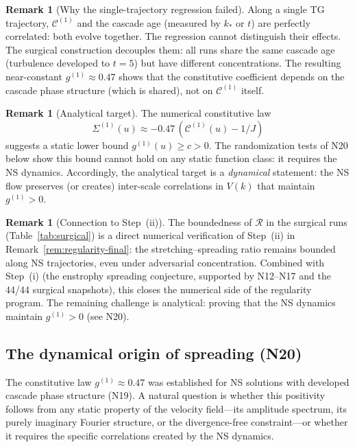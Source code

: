 \documentclass[11pt]{article}
\theoremstyle{definition}
\newtheorem{remark}[theorem]{Remark}
\newcommand{\cC}{\mathcal{C}}
\begin{document}
\begin{remark}[Why the single-trajectory regression
failed]
Along a single TG trajectory, $\cC^{(1)}$ and the
cascade age (measured by $k_*$ or $t$) are perfectly
correlated: both evolve together.  The regression
cannot distinguish their effects.  The surgical
construction decouples them: all runs share the same
cascade age (turbulence developed to $t=5$) but have
different concentrations.  The resulting near-constant
$g^{(1)}\approx 0.47$ shows that the constitutive
coefficient depends on the cascade phase structure
(which is shared), not on $\cC^{(1)}$ itself.
\end{remark}

\begin{remark}[Analytical target]
\label{rem:analytical-target}
The numerical constitutive law
\begin{equation}\label{eq:constitutive-target}
\Sigma^{(1)}(u) \approx -0.47\,
(\cC^{(1)}(u)-1/J)
\end{equation}
suggests a static lower bound
$g^{(1)}(u) \geq c > 0$.  The randomization
tests of N20 below show this bound cannot hold
on any static function class: it requires
the NS dynamics.  Accordingly, the analytical
target is a \emph{dynamical} statement:
the NS flow preserves (or creates)
inter-scale correlations in $V(k)$ that
maintain $g^{(1)}>0$.
\end{remark}

\begin{remark}[Connection to Step~(ii)]
\label{rem:step-ii}
The boundedness of $\mathcal{R}$ in the surgical
runs (Table~\ref{tab:surgical}) is a direct
numerical verification of Step~(ii) in
Remark~\ref{rem:regularity-final}: the
stretching--spreading ratio remains bounded along
NS trajectories, even under adversarial
concentration.  Combined with Step~(i) (the
enstrophy spreading conjecture, supported by
N12--N17 and the 44/44 surgical snapshots), this
closes the numerical side of the regularity program.
The remaining challenge is analytical: proving
that the NS dynamics maintain $g^{(1)}>0$
(see N20).
\end{remark}


\subsection{The dynamical origin of spreading (N20)}
\label{sec:dynamical}

The constitutive law $g^{(1)}\approx 0.47$ was
established for NS solutions with developed cascade
phase structure (N19).  A natural question is whether
this positivity follows from any static property of
the velocity field---its amplitude spectrum, its
purely imaginary Fourier structure, or the
divergence-free constraint---or whether it requires
the specific correlations created by the NS dynamics.
\end{document}
